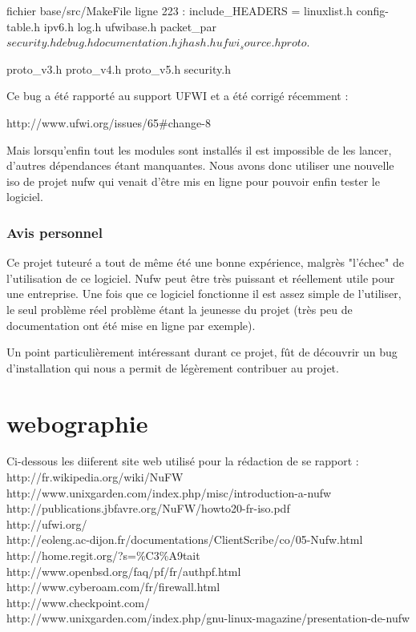 \documentclass[12pt]{report}
\begin{document}
\begin{itemize}
fichier base/src/MakeFile
ligne 223 :
include\_HEADERS = linuxlist.h config-table.h ipv6.h log.h ufwibase.h packet\_par$
security.h debug.h documentation.h jhash.h ufwi_source.h proto.$

proto\_v3.h proto\_v4.h proto\_v5.h security.h

Ce bug a été rapporté au support UFWI et a été corrigé récemment : 

http://www.ufwi.org/issues/65\#change-8

Mais lorsqu'enfin tout les modules sont installés il est impossible de les lancer, d'autres dépendances étant manquantes.
Nous avons donc utiliser une nouvelle iso de projet nufw qui venait d'être mis en ligne pour pouvoir enfin tester le logiciel.


\subsection{Avis personnel}


Ce projet tuteuré a tout de même été une bonne expérience, malgrès "l'échec" de l'utilisation de ce logiciel. 
Nufw peut être très puissant et réellement utile pour une entreprise. Une fois que ce logiciel fonctionne il est assez 
simple de l'utiliser, le seul problème réel problème étant la jeunesse du projet (très peu de documentation ont été mise en ligne par exemple).

Un point particulièrement intéressant durant ce projet, fût de découvrir un bug d'installation qui nous a permit de légèrement contribuer au projet.

\chapter{webographie}
Ci-dessous les diiferent site web utilisé pour la rédaction de se rapport :\\
http://fr.wikipedia.org/wiki/NuFW\\
http://www.unixgarden.com/index.php/misc/introduction-a-nufw\\
http://publications.jbfavre.org/NuFW/howto20-fr-iso.pdf\\
http://ufwi.org/\\
http://eoleng.ac-dijon.fr/documentations/ClientScribe/co/05-Nufw.html\\
http://home.regit.org/?s=\%C3\%A9tait\\
http://www.openbsd.org/faq/pf/fr/authpf.html\\
http://www.cyberoam.com/fr/firewall.html\\
http://www.checkpoint.com/\\
http://www.unixgarden.com/index.php/gnu-linux-magazine/presentation-de-nufw\\


\end{itemize}
\end{document}
